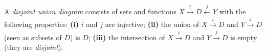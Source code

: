  A \textit{disjoint union diagram} consists of sets and functions $X \xrightarrow{i} D \xleftarrow{j} Y$ with the following properties: \textbf{(i)} $i$ and $j$ are injective; \textbf{(ii)} the union of $X \xrightarrow{i} D$ and $Y \xrightarrow{j} D$ (seen as subsets of $D$) is $D$; \textbf{(iii)} the intersection of $X \xrightarrow{i} D$ and $Y \xrightarrow{j} D$ is empty (they are \textit{disjoint}).
